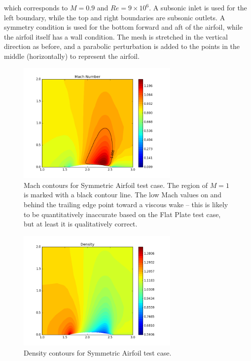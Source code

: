 \documentclass{article}
\begin{document}
which corresponds to $M=0.9$ and $Re=9\times10^6$. A subsonic inlet is used for the left boundary, while the top and right boundaries are subsonic outlets. A symmetry condition is used for the bottom forward and aft of the airfoil, while the airfoil itself has a wall condition. The mesh is stretched in the vertical direction as before, and a parabolic perturbation is added to the points in the middle (horizontally) to represent the airfoil.

\begin{figure}[!ht]
\centering
\includegraphics[width=0.7\textwidth]{images/airfoil_mach.png}
\caption{Mach contours for Symmetric Airfoil test case. The region of $M=1$ is marked with a black contour line. The low Mach values on and behind the trailing edge point toward a viscous wake -- this is likely to be quantitatively inaccurate based on the Flat Plate test case, but at least it is qualitatively correct.}
\label{fig:airfoil_mach}
\end{figure}

\begin{figure}[!ht]
\centering
\includegraphics[width=0.7\textwidth]{images/airfoil_density.png}
\caption{Density contours for Symmetric Airfoil test case. }
\label{fig:airfoil_density}
\end{figure}
\end{document}
